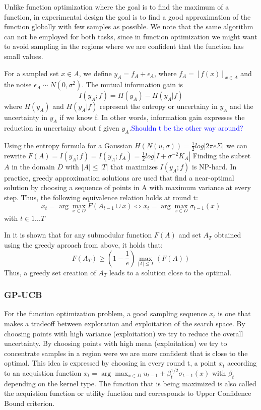 \documentclass[10pt,journal,a4paper]{IEEEtran}
\begin{document}
Unlike function optimization where the goal is to find the maximum of a function, in experimental design the goal is to find a good approximation of the function globally with few samples as possible. We note that the same algorithm can not be employed for both tasks, since in function optimization we might want to avoid sampling in the regions where we are confident that the function has small values.

For a sampled set $x\in A$, we define $y_A = f_A + \epsilon_A$, where  $f_A=[f(x)]_{x \in A}$ and the noise $\epsilon_A \sim N(0,\sigma^2)$.
 The mutual information gain is
\begin{equation}
	I(y_A; f) = H(y_A) - H(y_A| f)
\end{equation}
where $H(y_A)$ and $H(y_A|f)$ represent the entropy or uncertainy in $y_A$ and 
the uncertainty in $y_A$ if we know f. In other words, information gain expresses the reduction in uncertainy about f given $y_A$.\textcolor{blue}{Shouldn t be the other way around?}

Using the entropy formula for a Gaussian $H(N(u,\sigma)) =\frac{1}{2}log|2\pi e \Sigma|$ we can rewrite $F(A) =I(y_A; f)  = I(y_A; f_A) = \frac{1}{2} log|I + \sigma^{-2} K_A|$
Finding the subset $A$ in the domain $D$ with $|A| \leq |T|$ that maximizes $I(y_A; f)$ is NP-hard. In practice, greedy approximation solutions are used that find a near-optimal solution by choosing a sequence of points in A with maximum variance at every step. Thus, the following equivalence relation holds at round t:
\begin{equation}
x_t = \arg\max_{x\in D} F(A_{t-1}\cup {x}) \Longleftrightarrow 
x_t = \arg\max_{x\in D}\sigma_{t-1}(x) 
\end{equation}
with $t\in{1...T}$

In \cite{nemhauser1978analysis} it is shown that for any submodular function $F(A)$ and set
$A_T$ obtained using the greedy aproach from above, it holds that:
\begin{equation}
	F(A_T) \geq (1-\frac{1}{e}) \max_{|A| \leq T}(F(A))
\end{equation}
Thus, a greedy set creation of $A_T$ leads to a solution close to the optimal.

\subsubsection{GP-UCB}
For the function optimization problem, a good sampling sequence $x_t$ is one that makes a tradeoff between 
exploration and exploitation of the search space. By choosing points with high variance (exploitation) we try to reduce the overall uncertainty.
By choosing points with high mean (exploitation) we try to concentrate samples in a region were we are more confident that is close to the optimal. This idea is expressed by choosing in every round t, a point $x_t$  according to an acquistion function 
$x_t = \arg\max_{x\in D} u_{t-1} + \beta_{t}^{1/2}\sigma_{t-1}(x)$ with $\beta_{t}$ depending on the kernel type. The function that is being maximized is also called the acquistion function or utility function and corresponds to Upper Confidence Bound criterion.
\end{document}
